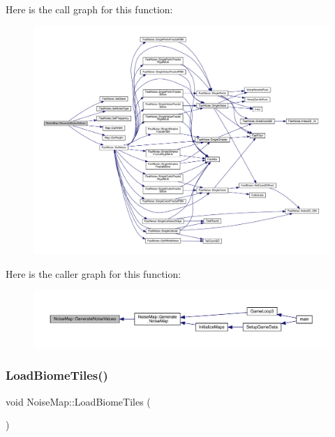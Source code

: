 Here is the call graph for this function\+:
\nopagebreak
\begin{figure}[H]
\begin{center}
\leavevmode
\includegraphics[width=350pt]{class_noise_map_aa9ba8032c97f9a5ea9f63c697b2f20e4_cgraph}
\end{center}
\end{figure}
Here is the caller graph for this function\+:
\nopagebreak
\begin{figure}[H]
\begin{center}
\leavevmode
\includegraphics[width=350pt]{class_noise_map_aa9ba8032c97f9a5ea9f63c697b2f20e4_icgraph}
\end{center}
\end{figure}
\mbox{\label{class_noise_map_ad8e07b9a0fc70191c781f1cdfef66b54}} 
\subsubsection{\texorpdfstring{Load\+Biome\+Tiles()}{LoadBiomeTiles()}}
{\footnotesize\ttfamily void Noise\+Map\+::\+Load\+Biome\+Tiles (\begin{DoxyParamCaption}{ }\end{DoxyParamCaption})}

